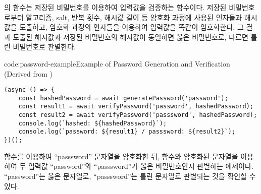 의  함수는 저장된 비밀번호를 이용하여 입력값을 검증하는 함수이다. 저장된 비밀번호로부터 알고리즘, salt, 반복 횟수, 해시값 길이 등 암호화 과정에 사용된 인자들과 해시값을 도출하고, 암호화 과정의 인자들을 이용하여 입력값을 똑같이 암호화한다. 그 결과 도출된 해시값과 저장된 비밀번호의 해시값이 동일하면 옳은 비밀번호로, 다르면 틀린 비밀번호로 판별한다.

\begin{code}{code:password-example}{Example of Password Generation and Verification (Derived from )}
\begin{verbatim}
(async () => {
    const hashedPassword = await generatePassword('password');
    const result1 = await verifyPassword('password', hashedPassword);
    const result2 = await verifyPassword('passsword', hashedPassword);
    console.log(`hashed: ${hashedPassword}`);
    console.log(`password: ${result1} / passsword: ${result2}`);
})();
\end{verbatim}
\end{code}

\은  함수를 이용하여 ``passsword'' 문자열을 암호화한 뒤,  함수와 암호화된 문자열을 이용하여 두 입력값 ``password''와 ``passsword''가 옳은 비밀번호인지 판별하는 예제이다. ``password''는 옳은 문자열로, ``passsword''는 틀린 문자열로 판별되는 것을 확인할 수 있다.
